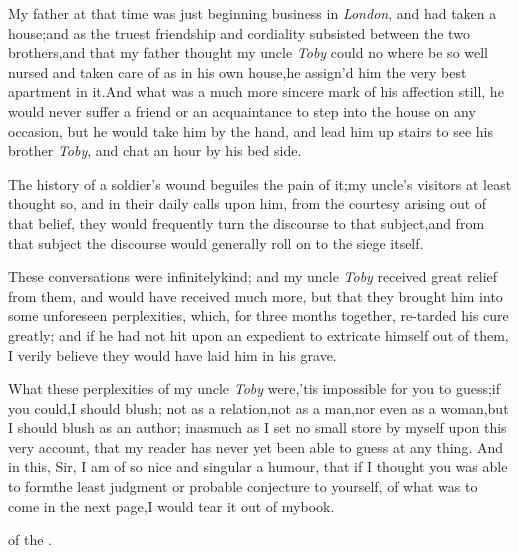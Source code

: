 \documentclass{article}
\begin{document}
My father at that time was just beginning business in
\textit{London}, and had taken a house;\tsk  and as the truest
friendship and cordiality subsisted between the two
brothers,\tsk  and that my father thought my uncle \textit{Toby} could no where be so well nursed
and taken care of as in his own house,\tsh  he
assign’d him the very best apartment in it.\tsk  And what
was a much more sincere mark of his affection still, he would never
suffer a friend or an acquaintance to step into the house on
any
occasion, but he would take him by the hand, and lead him up stairs
to see his brother \textit{Toby}, and chat an hour by his
bed side.

The history of a soldier’s wound beguiles the pain of
it;\tsk  my uncle’s visitors at least thought so, and in
their daily calls upon him, from the courtesy arising out of that
belief, they would frequently turn the discourse to that
subject,\tsk  and from that subject the discourse would generally
roll on to the siege itself.

These conversations were infinitely\break kind; and my uncle
\textit{Toby} received great relief from them, and would have
recei\-ved much more, but that they brought him into some unforeseen
perplexities, which, for three months together, re-\break tarded his
cure greatly; and if he had not hit upon an
expedient to extricate himself out of them, I verily believe they
would have laid him in his grave.

What these perplexities of my uncle \textit{Toby}
were,\tsh  ’tis impossible for you to guess;\tsk  if
you could,\tsk  I should blush; not as a relation,\tsk  not as a
man,\tsk  nor even as a woman,\tsk  but I should blush as an
author; inasmuch as I set no small store by myself upon this very
account, that my reader has never yet been able to guess at any
thing. And in this, Sir, I am of so nice and singular a humour,
that if I thought you was able to form\break the least judgment or
probable conjecture to yourself, of what was to come in the next
page,\tsk  I would tear it out of my\break book.

\bigskip
\centerline{\kern 4pt of the .}
\newpage\pagestyle{empty}\null
\end{document}
